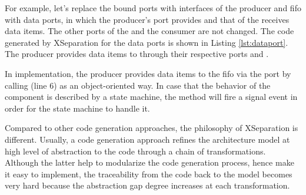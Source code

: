 For example, let's replace the bound ports with interfaces of the producer and fifo with data ports, in which the producer's port provides and that of the  receives data items.
The other ports of the  and the consumer are not changed.
The code generated by XSeparation for the data ports is shown in Listing \ref{lst:dataport}.
The  producer provides data items to  through their respective ports  and .

\begin{minipage}{\columnwidth}
	
\end{minipage} 

In implementation, the producer provides data items to the fifo via the port  by calling  (line 6) as an object-oriented way.
In case that the behavior of the component is described by a state machine, the  method will fire a signal event in order for the state machine to handle it.


\vskip 0.1cm
\noindent
{}
Compared to other code generation approaches, the philosophy of XSeparation is different.
Usually, a code generation approach refines the architecture model at high level of abstraction to the code through a chain of transformations.
Although the latter help to modularize the code generation process, hence make it easy to implement, the traceability from the code back to the model becomes very hard because the abstraction gap degree increases at each transformation.

